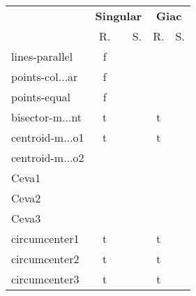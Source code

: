 {\scriptsize
\begin{longtable}{|l|*{2}{cr|}}
\hline
{\multirow{2}{*}{\bf Test}}
& \multicolumn{2}{c|}{\bf Singular}
& \multicolumn{2}{c|}{\bf Giac}
\\
&R.&S.
&R.&S.
\\ \hline
\cellcolor{blue!10}lines-parallel 
& \cellcolor{green!50}f & \cellcolor{green!50}{\bf 45} 
& \cellcolor{yellow!25} & \cellcolor{yellow!25}{ 239} 
\\ \hline
\cellcolor{blue!10}points-col$\ldots$ar 
& \cellcolor{green!50}f & \cellcolor{green!50}{\bf 31} 
& \cellcolor{yellow!25} & \cellcolor{yellow!25}{ 239} 
\\ \hline
\cellcolor{blue!10}points-equal 
& \cellcolor{green!40}f & \cellcolor{green!40}{\bf 82} 
& \cellcolor{yellow!25} & \cellcolor{yellow!25}{ 235} 
\\ \hline
\cellcolor{blue!10}bisector-m$\ldots$nt 
& \cellcolor{green!40}t & \cellcolor{green!40}{\bf 95} 
& \cellcolor{green!30}t & \cellcolor{green!30}{\sl 247} 
\\ \hline
\cellcolor{blue!10}centroid-m$\ldots$o1 
& \cellcolor{green!40}t & \cellcolor{green!40}{\bf 52} 
& \cellcolor{green!30}t & \cellcolor{green!30}{\sl 274} 
\\ \hline
\cellcolor{blue!10}centroid-m$\ldots$o2 
& \cellcolor{yellow!25} & \cellcolor{yellow!25}{ 19} 
& \cellcolor{yellow!25} & \cellcolor{yellow!25}{ 249} 
\\ \hline
\cellcolor{blue!10}Ceva1 
& \cellcolor{yellow!25} & \cellcolor{yellow!25}{ 54} 
& \cellcolor{yellow!25} & \cellcolor{yellow!25}{ 297} 
\\ \hline
\cellcolor{blue!10}Ceva2 
& \cellcolor{yellow!25} & \cellcolor{yellow!25}{ 19} 
& \cellcolor{yellow!25} & \cellcolor{yellow!25}{ 249} 
\\ \hline
\cellcolor{blue!10}Ceva3 
& \cellcolor{yellow!25} & \cellcolor{yellow!25}{ 19} 
& \cellcolor{yellow!25} & \cellcolor{yellow!25}{ 235} 
\\ \hline
\cellcolor{blue!10}circumcenter1 
& \cellcolor{green!50}t & \cellcolor{green!50}{\bf 38} 
& \cellcolor{green!30}t & \cellcolor{green!30}{\sl 246} 
\\ \hline
\cellcolor{blue!10}circumcenter2 
& \cellcolor{green!50}t & \cellcolor{green!50}{\bf 39} 
& \cellcolor{green!30}t & \cellcolor{green!30}{\sl 245} 
\\ \hline
\cellcolor{blue!10}circumcenter3 
& \cellcolor{green!40}t & \cellcolor{green!40}{\bf 64} 
& \cellcolor{green!30}t & \cellcolor{green!30}{\sl 241} 
\\ \hline

\end{longtable}}
